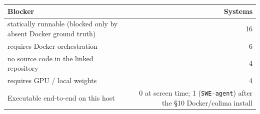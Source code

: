 \begin{tabular}{lr}
\toprule
Blocker & Systems \\
\midrule
statically runnable (blocked only by absent Docker ground truth) & 16 \\
requires Docker orchestration & 6 \\
no source code in the linked repository & 4 \\
requires GPU / local weights & 4 \\
\midrule Executable end-to-end on this host & 0 at screen time; 1 (\texttt{SWE-agent}) after the \S10 Docker/colima install \\
\bottomrule
\end{tabular}
